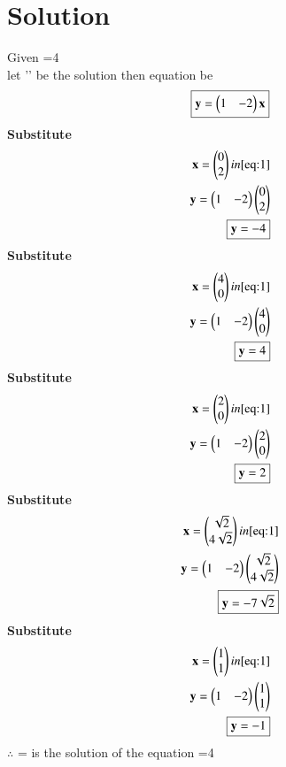 \documentclass[journal,12pt,twocolumn]{IEEEtran}
\begin{document}
\section{Solution}
Given 
=4\\
let '' be the solution then equation be 
\begin{equation} \label{eq:1}
\boxed{\mathbf{y}=\begin{pmatrix}1&-2\end{pmatrix}\mathbf{x}}
\end{equation}
\textbf{Substitute}
\begin{align}
 \mathbf{x}=\begin{pmatrix}0\\2\end{pmatrix}in \eqref{eq:1}\\
          \mathbf{y}=\begin{pmatrix}1&-2\end{pmatrix}\begin{pmatrix}0\\2\end{pmatrix}\\
          \boxed{\mathbf{y}=-4}
\end{align}
\textbf{Substitute }
\begin{align}
\mathbf{x}=\begin{pmatrix}4\\0\end{pmatrix}in \eqref{eq:1}\\
          \mathbf{y}=\begin{pmatrix}1&-2\end{pmatrix}\begin{pmatrix}4\\0\end{pmatrix}\\
          \boxed{\mathbf{y}=4}
\end{align}
\textbf{Substitute}
\begin{align}
 \mathbf{x}=\begin{pmatrix}2\\0\end{pmatrix}in \eqref{eq:1}\\
          \mathbf{y}=\begin{pmatrix}1&-2\end{pmatrix}\begin{pmatrix}2\\0\end{pmatrix}\\
          \boxed{\mathbf{y}=2}   
\end{align}
\textbf{Substitute}
\begin{align}
\mathbf{x}=\begin{pmatrix}\sqrt{2}\\4\sqrt{2}\end{pmatrix}in \eqref{eq:1}\\
          \mathbf{y}=\begin{pmatrix}1&-2\end{pmatrix}\begin{pmatrix}\sqrt{2}\\4\sqrt{2}\end{pmatrix}\\
          \boxed{\mathbf{y}=-7\sqrt{2}}    
\end{align}
\textbf{Substitute} 
\begin{align}
\mathbf{x}=\begin{pmatrix}1\\1\end{pmatrix}in \eqref{eq:1}\\
          \mathbf{y}=\begin{pmatrix}1&-2\end{pmatrix}\begin{pmatrix}1\\1\end{pmatrix}\\
          \boxed{\mathbf{y}=-1}
\end{align}
$\therefore$ 
= is the solution of the equation =4
\end{document}
